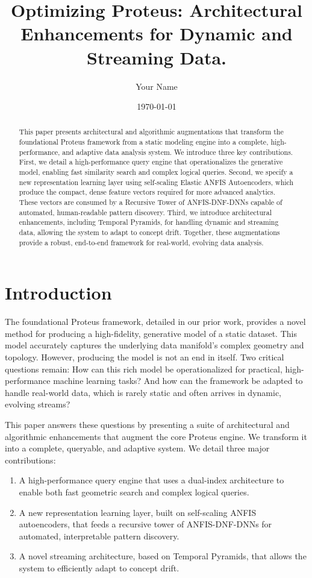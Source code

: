 \documentclass{article}
\title{Optimizing Proteus: Architectural Enhancements for Dynamic and Streaming Data.}
\author{Your Name}
\date{\today}
\begin{document}
\maketitle

\begin{abstract}
This paper presents architectural and algorithmic augmentations that transform the foundational Proteus framework from a static modeling engine into a complete, high-performance, and adaptive data analysis system. We introduce three key contributions. First, we detail a high-performance query engine that operationalizes the generative model, enabling fast similarity search and complex logical queries. Second, we specify a new representation learning layer using self-scaling Elastic ANFIS Autoencoders, which produce the compact, dense feature vectors required for more advanced analytics. These vectors are consumed by a Recursive Tower of ANFIS-DNF-DNNs capable of automated, human-readable pattern discovery. Third, we introduce architectural enhancements, including Temporal Pyramids, for handling dynamic and streaming data, allowing the system to adapt to concept drift. Together, these augmentations provide a robust, end-to-end framework for real-world, evolving data analysis.
\end{abstract}

\section{Introduction}

The foundational Proteus framework, detailed in our prior work, provides a novel method for producing a high-fidelity, generative model of a static dataset. This model accurately captures the underlying data manifold's complex geometry and topology. However, producing the model is not an end in itself. Two critical questions remain: How can this rich model be operationalized for practical, high-performance machine learning tasks? And how can the framework be adapted to handle real-world data, which is rarely static and often arrives in dynamic, evolving streams?

This paper answers these questions by presenting a suite of architectural and algorithmic enhancements that augment the core Proteus engine. We transform it into a complete, queryable, and adaptive system. We detail three major contributions:
\begin{enumerate}
    \item A high-performance query engine that uses a dual-index architecture to enable both fast geometric search and complex logical queries.
    \item A new representation learning layer, built on self-scaling ANFIS autoencoders, that feeds a recursive tower of ANFIS-DNF-DNNs for automated, interpretable pattern discovery.
    \item A novel streaming architecture, based on Temporal Pyramids, that allows the system to efficiently adapt to concept drift.
\end{enumerate}
\end{document}
